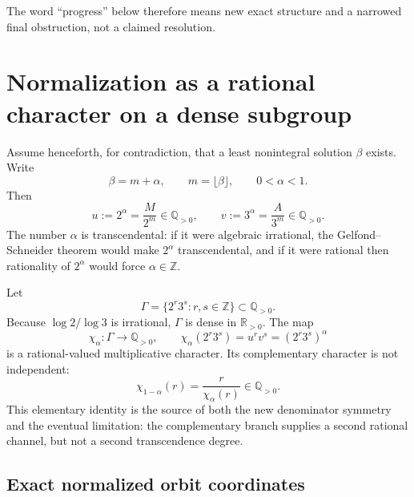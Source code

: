 \documentclass[11pt]{article}
\theoremstyle{definition}
\theoremstyle{remark}
\newcommand{\Q}{\mathbb{Q}}
\newcommand{\Z}{\mathbb{Z}}
\newcommand{\R}{\mathbb{R}}
\begin{document}
The word ``progress'' below therefore means new exact structure and a narrowed final obstruction, not a claimed resolution.

\section{Normalization as a rational character on a dense subgroup}
\label{sec:normalization}

Assume henceforth, for contradiction, that a least nonintegral solution $\beta$ exists.  Write
\begin{equation}\label{eq:beta-alpha}
 \beta=m+\alpha,\qquad m=\lfloor\beta\rfloor,\qquad 0<\alpha<1.
\end{equation}
Then
\begin{equation}\label{eq:u-v}
 u:=2^\alpha=\frac{M}{2^m}\in\Q_{>0},\qquad
 v:=3^\alpha=\frac{A}{3^m}\in\Q_{>0}.
\end{equation}
The number $\alpha$ is transcendental: if it were algebraic irrational, the Gelfond--Schneider theorem would make $2^\alpha$ transcendental, and if it were rational then rationality of $2^\alpha$ would force $\alpha\in\Z$.

Let
\[
 \Gamma=\{2^r3^s:r,s\in\Z\}\subset\Q_{>0}.
\]
Because $\log2/\log3$ is irrational, $\Gamma$ is dense in $\R_{>0}$.  The map
\begin{equation}\label{eq:chi}
 \chi_\alpha:\Gamma\longrightarrow\Q_{>0},\qquad
 \chi_\alpha(2^r3^s)=u^rv^s=(2^r3^s)^\alpha
\end{equation}
 is a rational-valued multiplicative character.  Its complementary character is not independent:
\begin{equation}\label{eq:compchar}
 \chi_{1-\alpha}(r)=\frac{r}{\chi_\alpha(r)}\in\Q_{>0}.
\end{equation}
This elementary identity is the source of both the new denominator symmetry and the eventual limitation: the complementary branch supplies a second rational channel, but not a second transcendence degree.

\subsection{Exact normalized orbit coordinates}
\end{document}
